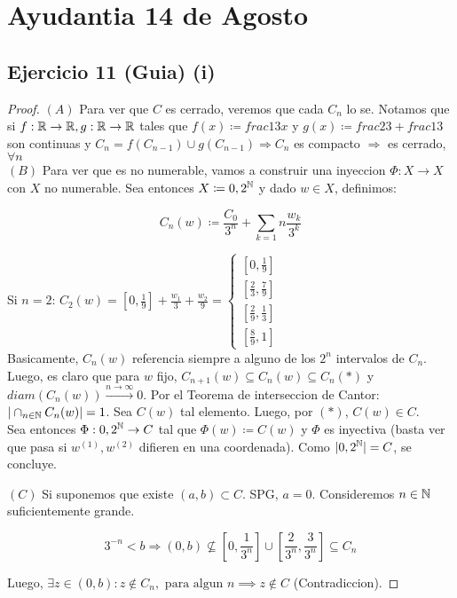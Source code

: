 
\section{Ayudantia 14 de Agosto}

\subsection{Ejercicio 11 (Guia) (i)}  

\begin{proof}
	$(A)$ Para ver que $C$ es cerrado, veremos que cada $C_n$ lo se. Notamos que si $f:\mathbb{R} \to \mathbb{R}, g:\mathbb{R}\to\mathbb{R}$ tales que $f(x)\coloneqq frac{1}{3} x$ y $g(x)\coloneqq frac{2}{3} + frac{1}{3}$ son continuas y $C_n=f(C_{n-1})\cup g(C_{n-1})\Rightarrow C_n$ es compacto $\Rightarrow$ es cerrado, $\forall n$ \\

	$(B)$ Para ver que es no numerable, vamos a construir una inyeccion $\Phi : X\to X$ con $X$ no numerable. Sea entonces $X\coloneqq {0,2}^{\mathbb{N}}$ y dado $w\in X$, definimos:

	\[
		C_n(w)\coloneqq\frac{C_0}{3^n} + \sum_{k=1}{n}\frac{w_k}{3^k}
	\]

	Si $n=2$: $C_2(w) = [0,\frac{1}{9}] + \frac{w_1}{3} + \frac{w_2}{9} = \begin{cases}
		[0,\frac{1}{9}] \\
		[\frac{2}{3},\frac{7}{9}] \\
		[\frac{2}{9},\frac{1}{3}] \\
		[\frac{8}{9},1]
	\end{cases}$ \\

	Basicamente, $C_n(w)$ referencia siempre a alguno de los $2^n$ intervalos de $C_n$. Luego, es claro que para $w$ fijo, $C_{n+1}(w)\subseteq C_n(w)\subseteq C_n (*)$ y $diam(C_n(w))\xrightarrow{n\to\infty} 0$. Por el Teorema de interseccion de Cantor: $|\cap_{n\in\mathbb{N}} C_n(w)|=1$. Sea $C(w)$ tal elemento. Luego, por $(*)$, $C(w)\in C$. \\

	Sea entonces $\Phi : {0,2}^{\mathbb{N}}\to C$ tal que $\Phi(w)\coloneqq C(w)$ y $\Phi$ es inyectiva (basta ver que pasa si $w^{(1)},w^{(2)}$ difieren en una coordenada). Como $|{0,2}^{\mathbb{N}}|=C$, se concluye.

	$(C)$ Si suponemos que existe $(a,b)\subset C$. SPG, $a=0$. Consideremos $n\in\mathbb{N}$ suficientemente grande.

	\[
	3^{-n}<b  \Rightarrow (0,b) \nsubseteq [0,\frac{1}{3^n}]\cup[\frac{2}{3^n},\frac{3}{3^n}]\subseteq C_n
	\]

	Luego, $\exists z \in (0,b): z\not\in C_n, \text{ para algun } n \implies z\not\in C$ (Contradiccion).
\end{proof}

